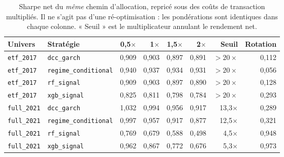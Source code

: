 \begin{table}[htbp]
  \centering
  \small
  \caption[Sensibilité aux coûts]{Sharpe net du \emph{même} chemin d'allocation, repricé sous des coûts de transaction multipliés. Il ne s'agit pas d'une ré-optimisation : les pondérations sont identiques dans chaque colonne. « Seuil » est le multiplicateur annulant le rendement net.}
  \label{tab:couts}
  \begin{tabular}{@{}llrrrrrr@{}}
    \toprule
    Univers & Stratégie & 0,5$\times$ & 1$\times$ & 1,5$\times$ & 2$\times$ & Seuil & Rotation \\
    \midrule
    \texttt{etf\_2017} & \texttt{dcc\_garch} & 0,909 & 0,903 & 0,897 & 0,891 & $>20\times$ & 0,112 \\
    \texttt{etf\_2017} & \texttt{regime\_conditional} & 0,940 & 0,937 & 0,934 & 0,931 & $>20\times$ & 0,056 \\
    \texttt{etf\_2017} & \texttt{rf\_signal} & 0,909 & 0,903 & 0,897 & 0,890 & $>20\times$ & 0,128 \\
    \texttt{etf\_2017} & \texttt{xgb\_signal} & 0,825 & 0,811 & 0,798 & 0,784 & $>20\times$ & 0,293 \\
    \texttt{full\_2021} & \texttt{dcc\_garch} & 1,032 & 0,994 & 0,956 & 0,917 & 13,3$\times$ & 0,289 \\
    \texttt{full\_2021} & \texttt{regime\_conditional} & 0,997 & 0,957 & 0,917 & 0,877 & 12,5$\times$ & 0,321 \\
    \texttt{full\_2021} & \texttt{rf\_signal} & 0,769 & 0,679 & 0,588 & 0,498 & 4,5$\times$ & 0,948 \\
    \texttt{full\_2021} & \texttt{xgb\_signal} & 0,962 & 0,867 & 0,772 & 0,676 & 5,3$\times$ & 0,973 \\
    \bottomrule
  \end{tabular}
\end{table}
